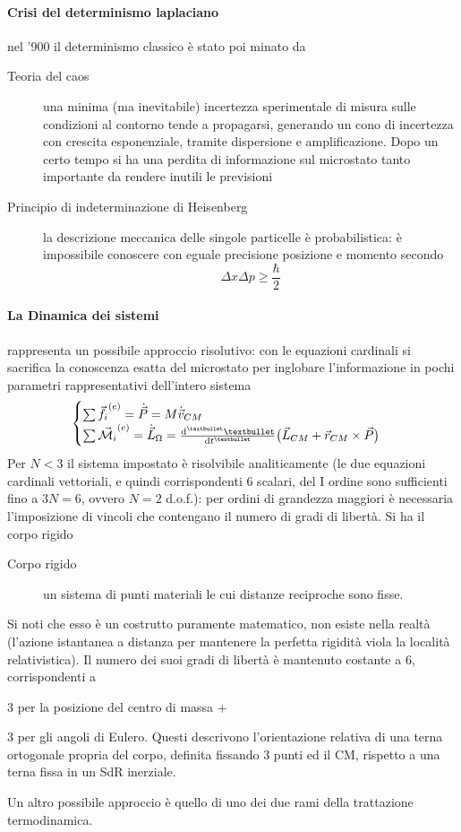 \documentclass[10pt, oneside]{book}
\begin{document}
\paragraph{Crisi del determinismo laplaciano} nel '900 il determinismo classico è stato poi minato da 
\begin{description}
\item[Teoria del caos] una minima (ma inevitabile) incertezza sperimentale di misura sulle condizioni al contorno tende a propagarsi, generando un cono di incertezza con crescita esponenziale, tramite dispersione e amplificazione. Dopo un certo tempo si ha una perdita di informazione sul microstato tanto importante da rendere inutili le previsioni
\item[Principio di indeterminazione di Heisenberg] la descrizione meccanica delle singole particelle è probabilistica: è impossibile conoscere con eguale precisione posizione e momento secondo
\[\Delta x \Delta p \geq \frac{\hbar}{2}\]
\end{description}
\paragraph{La Dinamica dei sistemi} rappresenta un possibile approccio risolutivo: con le equazioni cardinali si sacrifica la conoscenza esatta del microstato per inglobare l'informazione in pochi parametri rappresentativi dell'intero sistema
\[\begin{cases}
\sum \vec{f_i}^{(e)} = \dot{ \vec{P}} = M \dot{ \vec{v}}_{CM}\\
\sum \vec{\mathcal{M}_i}^{(e)} = \dot{ \vec{L}}_\Omega = \dv[•]{•}{t} \big(\vec{L}_{CM} + \vec{r}_{CM} \times \vec{P}\big)\\
\end{cases}\]
Per $N < 3$ il sistema impostato è risolvibile analiticamente (le due equazioni cardinali vettoriali, e quindi corrispondenti 6 scalari, del I ordine sono sufficienti fino a $3N = 6$, ovvero $N=2$ d.o.f.): per ordini di grandezza maggiori è necessaria l'imposizione di vincoli che contengano il numero di gradi di libertà. Si ha il corpo rigido
\begin{description}
\item[Corpo rigido] un sistema di punti materiali le cui distanze reciproche sono fisse.
\end{description}
Si noti che esso è un costrutto puramente matematico, non esiste nella realtà (l'azione istantanea a distanza per mantenere la perfetta rigidità viola la località relativistica). Il numero dei suoi gradi di libertà è mantenuto costante a $6$, corrispondenti a
\begin{description}
\item 3 per la posizione del centro di massa +
\item 3 per gli angoli di Eulero. Questi descrivono l'orientazione relativa di una terna ortogonale propria del corpo, definita fissando 3 punti ed il CM, rispetto a una terna fissa in un SdR inerziale.
\end{description}
Un altro possibile approccio è quello di uno dei due rami della trattazione termodinamica.
\end{document}
